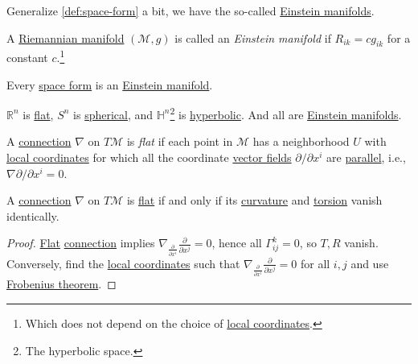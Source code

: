 Generalize \autoref{def:space-form} a bit, we have the so-called \hyperref[def:Einstein-manifold]{Einstein manifolds}.

\begin{definition}\label{def:Einstein-manifold}
	A \hyperref[def:Riemannian-manifold]{Riemannian manifold} \((\mathcal{M} , g)\) is called an \emph{Einstein manifold} if \(R_{ik} = c g_{ik} \) for a constant \(c\).\footnote{Which does not depend on the choice of \hyperref[def:coordinate-chart]{local coordinates}.}
\end{definition}

\begin{remark}
	Every \hyperref[def:space-form]{space form} is an \hyperref[def:Einstein-manifold]{Einstein manifold}.
\end{remark}

\begin{eg}
	\(\mathbb{R} ^n\) is \hyperref[def:space-form-flat]{flat}, \(S^n\) is \hyperref[def:space-form-spherical]{spherical}, and \(\mathbb{H} ^n\)\footnote{The hyperbolic space.} is \hyperref[def:space-form-hyperbolic]{hyperbolic}. And all are \hyperref[def:Einstein-manifold]{Einstein manifolds}.
	\begin{center}
	\end{center}
\end{eg}

\begin{definition}[Flat]\label{def:connection-flat}
	A \hyperref[def:linear-connection]{connection} \(\nabla \) on \(T \mathcal{M} \) is \emph{flat} if each point in \(\mathcal{M} \) has a neighborhood \(U\) with \hyperref[def:coordinate-chart]{local coordinates} for which all the coordinate \hyperref[def:vector-field]{vector fields} \(\partial / \partial x^i\) are \hyperref[def:parallel]{parallel}, i.e., \(\nabla \partial / \partial x^i = 0\).
\end{definition}

\begin{theorem}
	A \hyperref[def:linear-connection]{connection} \(\nabla \) on \(T \mathcal{M} \) is \hyperref[def:connection-flat]{flat} if and only if its \hyperref[def:Riemannian-curvature]{curvature} and \hyperref[def:torsion]{torsion} vanish identically.
\end{theorem}
\begin{proof}
	\hyperref[def:connection-flat]{Flat} \hyperref[def:linear-connection]{connection} implies \(\nabla _{\frac{\partial }{\partial x^i} } \frac{\partial }{\partial x^j} = 0\), hence all \(\Gamma ^k _{ij} = 0\), so \(T, R\) vanish. Conversely, find the \hyperref[def:coordinate-chart]{local coordinates} such that \(\nabla _{\frac{\partial }{\partial x^i} } \frac{\partial }{\partial x^j} = 0\) for all \(i, j\) and use \href{https://en.wikipedia.org/wiki/Frobenius_theorem_(differential_topology)}{Frobenius theorem}.
\end{proof}

